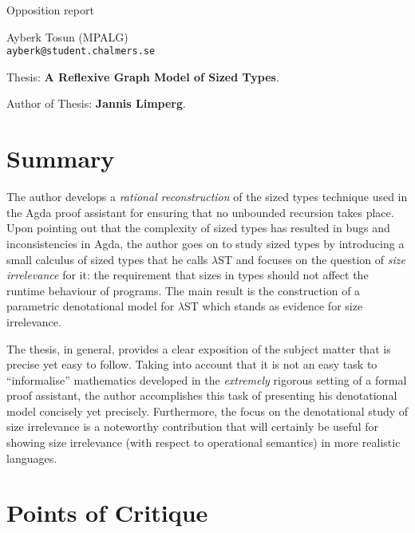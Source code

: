 \documentclass[a4paper, 11pt]{article}
\begin{document}

\begin{center}
\Large Opposition report\\ 

\vspace{5pt}

\large Ayberk Tosun (MPALG)\\
\texttt{ayberk@student.chalmers.se}
\end{center}

\normalsize

\noindent Thesis: \textbf{A Reflexive Graph Model of Sized Types}.

\noindent Author of Thesis: \textbf{Jannis Limperg}.

\section{Summary}

The author develops a \emph{rational reconstruction} of the sized types technique used in
the Agda proof assistant for ensuring that no unbounded recursion takes place. Upon
pointing out that the complexity of sized types has resulted in bugs and inconsistencies
in Agda, the author goes on to study sized types by introducing a small calculus of sized
types that he calls $\lambda$ST and focuses on the question of \emph{size irrelevance} for it:
the requirement that sizes in types should not affect the runtime behaviour of programs.
The main result is the construction of a parametric denotational model for $\lambda$ST which
stands as evidence for size irrelevance.

The thesis, in general, provides a clear exposition of the subject matter that is precise
yet easy to follow. Taking into account that it is not an easy task to ``informalise''
mathematics developed in the \emph{extremely} rigorous setting of a formal proof
assistant, the author accomplishes this task of presenting his denotational model
concisely yet precisely. Furthermore, the focus on the denotational study of size
irrelevance is a noteworthy contribution that will certainly be useful for showing size
irrelevance (with respect to operational semantics) in more realistic languages.

\section{Points of Critique}\label{sec:critique}
\end{document}
